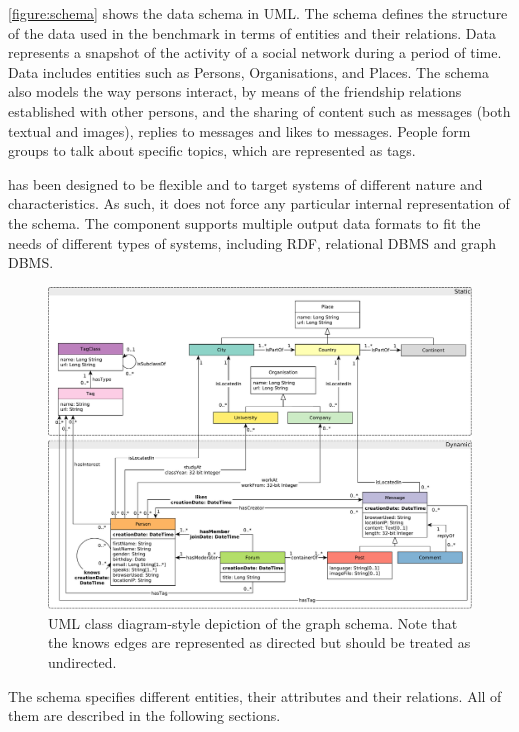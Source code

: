 \autoref{figure:schema} shows the data schema in UML. The schema defines the
structure of the data used in the benchmark in terms of entities and their
relations. Data represents a snapshot of the activity of a social network
during a period of time. Data includes entities such as Persons, Organisations,
and Places. The schema also models the way persons interact, by means of the
friendship relations established with other persons, and the sharing of content
such as messages (both textual and images), replies to messages and likes to
messages.  People form groups to talk about specific topics, which are
represented as tags.

\ldbcsnb has been designed to be flexible and to target systems of different
nature and characteristics. As such, it does not force any particular internal
representation of the schema. The \datagen component
supports multiple output data formats to
fit the needs of different types of systems, including RDF, relational DBMS and
graph DBMS.

\begin{figure}[htbp]
    \centering
    \includegraphics[width=\linewidth]{figures/schema-comfortable}
    \caption{UML class diagram-style depiction of the \ldbcsnb graph schema. Note that the \textsf{knows} edges are represented as directed but should be treated as undirected.}
    \label{figure:schema}
\end{figure}

The schema specifies different entities, their attributes and their relations.
All of them are described in the following sections.

